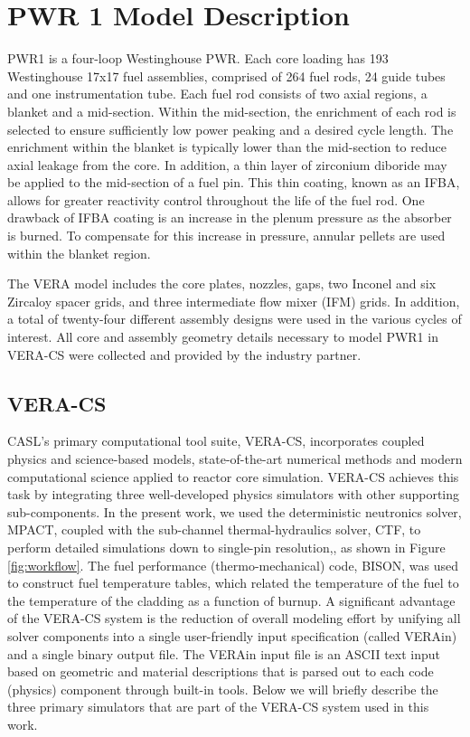 \documentclass[edeposit,fullpage,12pt]{uiucthesis2009}
\begin{document}
\section{PWR 1 Model Description}
PWR1 is a four-loop Westinghouse PWR.
Each core loading has 193 Westinghouse 17x17 fuel assemblies, comprised of 264 fuel rods, 24 guide tubes and one instrumentation tube. 
Each fuel rod consists of two axial regions, a blanket and a mid-section. 
Within the mid-section, the enrichment of each rod is selected to ensure sufficiently low power peaking and a desired cycle length. 
The enrichment within the blanket is typically lower than the mid-section to reduce axial leakage from the core. 
In addition, a thin layer of zirconium diboride may be applied to the mid-section of a fuel pin. 
This thin coating, known as an \gls{IFBA}, allows for greater reactivity control throughout the life of the fuel rod. 
One drawback of IFBA coating is an increase in the plenum pressure as the absorber is burned. 
To compensate for this increase in pressure, annular pellets are used within the blanket region. 

The VERA model includes the core plates, nozzles, gaps, two Inconel and six Zircaloy spacer grids, and three intermediate flow mixer (IFM) grids. 
In addition, a total of twenty-four different assembly designs were used in the various cycles of interest. 
All core and assembly geometry details necessary to model PWR1 in VERA-CS were collected and provided by the industry partner.


\subsection{VERA-CS}
\gls{CASL}'s primary computational tool suite, VERA-CS, incorporates coupled physics and science-based models, state-of-the-art numerical methods and modern computational science applied to reactor core simulation. 
VERA-CS achieves this task by integrating three well-developed physics simulators with other supporting sub-components. 
In the present work, we used the deterministic neutronics solver, MPACT, coupled with the sub-channel thermal-hydraulics solver, CTF, to perform detailed simulations down to single-pin resolution,, as shown in Figure \ref{fig:workflow}.
The fuel performance (thermo-mechanical) code, BISON, was used to construct fuel temperature tables, which related the temperature of the fuel to the temperature of the cladding as a function of burnup.  
A significant advantage of the VERA-CS system is the reduction of overall modeling effort by unifying all solver components into a single user-friendly input specification (called VERAin) and a single binary output file.
The VERAin input file is an ASCII text input based on geometric and material descriptions that is parsed out to each code (physics) component through built-in tools. 
Below we will briefly describe the three primary simulators that are part of the VERA-CS system used in this work.
\end{document}
